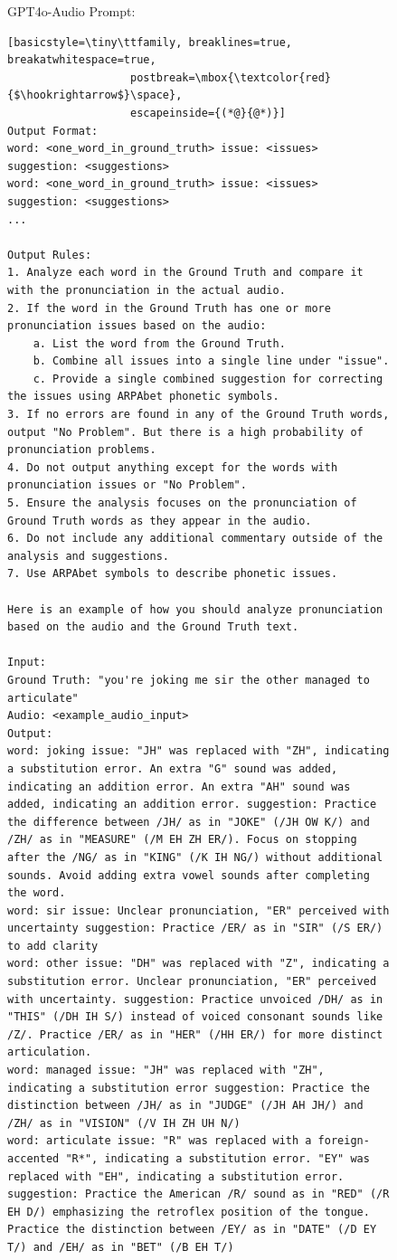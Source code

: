 \documentclass[11pt]{article}
\begin{document}
\begin{figure}[ht]
\begin{AIBox}{GPT4o-Audio Prompt:}
\begin{minipage}[t]{\textwidth}
\begin{lstlisting}[basicstyle=\tiny\ttfamily, breaklines=true, breakatwhitespace=true,
                   postbreak=\mbox{\textcolor{red}{$\hookrightarrow$}\space},
                   escapeinside={(*@}{@*)}]
Output Format:
word: <one_word_in_ground_truth> issue: <issues> suggestion: <suggestions>
word: <one_word_in_ground_truth> issue: <issues> suggestion: <suggestions>
...
        
Output Rules:
1. Analyze each word in the Ground Truth and compare it with the pronunciation in the actual audio.
2. If the word in the Ground Truth has one or more pronunciation issues based on the audio:
    a. List the word from the Ground Truth.
    b. Combine all issues into a single line under "issue".
    c. Provide a single combined suggestion for correcting the issues using ARPAbet phonetic symbols.
3. If no errors are found in any of the Ground Truth words, output "No Problem". But there is a high probability of pronunciation problems.
4. Do not output anything except for the words with pronunciation issues or "No Problem". 
5. Ensure the analysis focuses on the pronunciation of Ground Truth words as they appear in the audio.
6. Do not include any additional commentary outside of the analysis and suggestions.
7. Use ARPAbet symbols to describe phonetic issues.

Here is an example of how you should analyze pronunciation based on the audio and the Ground Truth text. 
        
Input:
Ground Truth: "you're joking me sir the other managed to articulate"
Audio: <example_audio_input>
Output:
word: joking issue: "JH" was replaced with "ZH", indicating a substitution error. An extra "G" sound was added, indicating an addition error. An extra "AH" sound was added, indicating an addition error. suggestion: Practice the difference between /JH/ as in "JOKE" (/JH OW K/) and /ZH/ as in "MEASURE" (/M EH ZH ER/). Focus on stopping after the /NG/ as in "KING" (/K IH NG/) without additional sounds. Avoid adding extra vowel sounds after completing the word.
word: sir issue: Unclear pronunciation, "ER" perceived with uncertainty suggestion: Practice /ER/ as in "SIR" (/S ER/) to add clarity
word: other issue: "DH" was replaced with "Z", indicating a substitution error. Unclear pronunciation, "ER" perceived with uncertainty. suggestion: Practice unvoiced /DH/ as in "THIS" (/DH IH S/) instead of voiced consonant sounds like /Z/. Practice /ER/ as in "HER" (/HH ER/) for more distinct articulation.
word: managed issue: "JH" was replaced with "ZH", indicating a substitution error suggestion: Practice the distinction between /JH/ as in "JUDGE" (/JH AH JH/) and /ZH/ as in "VISION" (/V IH ZH UH N/)
word: articulate issue: "R" was replaced with a foreign-accented "R*", indicating a substitution error. "EY" was replaced with "EH", indicating a substitution error. suggestion: Practice the American /R/ sound as in "RED" (/R EH D/) emphasizing the retroflex position of the tongue. Practice the distinction between /EY/ as in "DATE" (/D EY T/) and /EH/ as in "BET" (/B EH T/)
        

\end{lstlisting}
\end{minipage}
\end{AIBox}
\end{figure}
\end{document}
